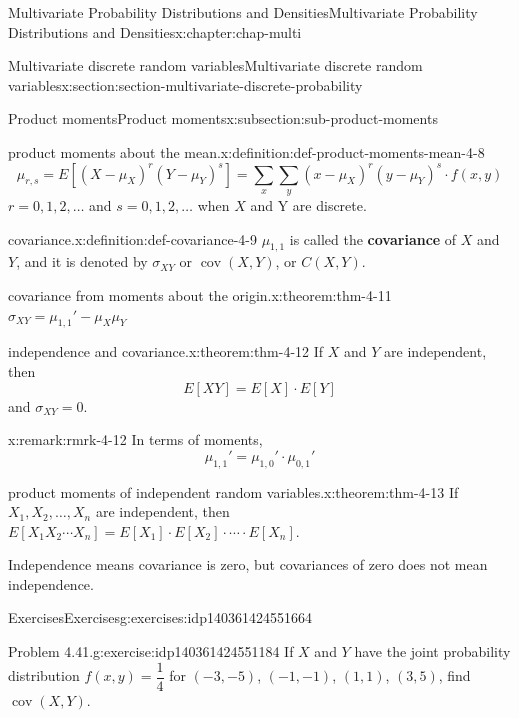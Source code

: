 \documentclass[oneside,10pt,]{book}
\newcommand{\terminology}[1]{\textbf{#1}}
\numberwithin{equation}{section}
\begin{document}
\begin{chapterptx}{Multivariate Probability Distributions and Densities}{}{Multivariate Probability Distributions and Densities}{}{}{x:chapter:chap-multi}
\begin{sectionptx}{Multivariate discrete random variables}{}{Multivariate discrete random variables}{}{}{x:section:section-multivariate-discrete-probability}
\begin{subsectionptx}{Product moments}{}{Product moments}{}{}{x:subsection:sub-product-moments}
\begin{definition}{product moments about the mean.}{x:definition:def-product-moments-mean-4-8}
\begin{equation*}
\mu_{r,s}=E[(X-\mu_X)^r(Y-\mu_Y)^s] = \sum_x\sum_y (x-\mu_X)^r
(y-\mu_Y)^s\cdot f(x, y)
\end{equation*}
\(\displaystyle r = 0,1,2, \dots\) and \(\displaystyle s = 0,1,2, \dots\) when \(X\) and Y are discrete.%
\end{definition}
\begin{definition}{covariance.}{x:definition:def-covariance-4-9}%
\(\displaystyle \mu_{1,1}\) is called the \terminology{covariance} of \(X\) and \(Y\), and it is denoted by \(\displaystyle \sigma_{XY}\) or \(\displaystyle
\operatorname{cov}(X, Y)\), or \(\displaystyle C(X, Y)\).%
\end{definition}
\begin{theorem}{covariance from moments about the origin.}{}{x:theorem:thm-4-11}%
\(\displaystyle \sigma_{XY} = \mu_{1,1}' - \mu_X \mu_Y\)%
\end{theorem}
\begin{theorem}{independence and covariance.}{}{x:theorem:thm-4-12}%
If \(X\) and \(Y\) are independent, then%
\begin{equation*}
\displaystyle E[XY] = E[X]\cdot E[Y]
\end{equation*}
and \(\displaystyle \sigma_{XY} = 0\).%
\end{theorem}
\begin{remark}{}{x:remark:rmrk-4-12}%
In terms of moments,%
\begin{equation*}
\displaystyle\mu_{1,1}' = \mu_{1,0}'\cdot \mu_{0,1}'
\end{equation*}
\end{remark}
\begin{theorem}{product moments of independent random variables.}{}{x:theorem:thm-4-13}%
If \(\displaystyle X_1, X_2, \dots, X_n\) are independent, then \(\displaystyle E[X_1X_2\cdots X_n] = E[X_1]\cdot
E[X_2]\cdot\cdots\cdot E[X_n]\).%
\end{theorem}
Independence means covariance is zero, but covariances of zero does not mean independence.%
\end{subsectionptx}
%
%
\typeout{************************************************}
\typeout{************************************************}
%
\begin{exercises-subsection}{Exercises}{}{Exercises}{}{}{g:exercises:idp140361424551664}
\begin{divisionexercise}{1}{Problem 4.41.}{}{g:exercise:idp140361424551184}%
If \(X\) and \(Y\) have the joint probability distribution \(f(x, y) = \dfrac{1}{4}\) for \((-3, -5)\),  \((-1, -1)\), \((1, 1)\),  \((3, 5)\), find \(\operatorname{cov}(X, Y)\).%

\end{divisionexercise}
\end{exercises-subsection}
\end{sectionptx}
\end{chapterptx}
\end{document}

